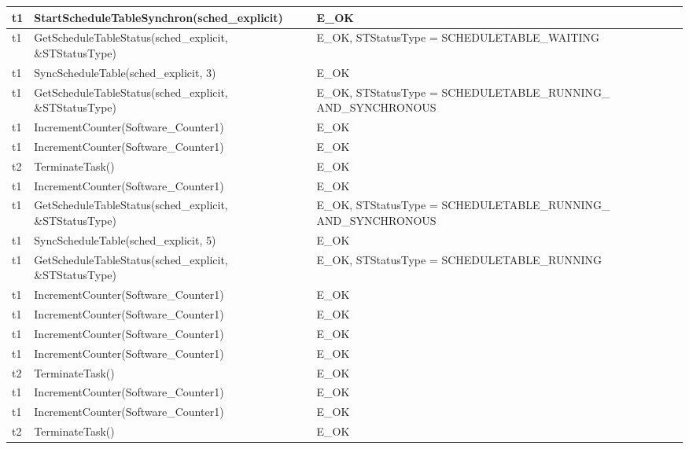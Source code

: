 \documentclass[10pt]{article}
\newlength{\Li}\settowidth{\Li}{Running}
\newlength{\Lii}\setlength{\Lii}{7cm}
\newlength{\Liiii}\setlength{\Liiii}{0.9cm}
\newlength{\Liii}\setlength{\Liii}{\textwidth} \addtolength{\Liii}{-\Li} \addtolength{\Liii}{-\Lii} \addtolength{\Liii}{-\Liiii}
\begin{document}
	\begin{supertabular}{|p{\Li}|p{\Lii}|p{\Liii}|p{\Liiii}|} \hline 
	t1		& StartScheduleTableSynchron(sched\_explicit)					& E\_OK																	& \\ \hline
	t1		& GetScheduleTableStatus(sched\_explicit, \&STStatusType)			& E\_OK, STStatusType = SCHEDULETABLE\_WAITING								& \\ \hline
	t1		& SyncScheduleTable(sched\_explicit, 3)							& E\_OK																	& \\ \hline
	t1		& GetScheduleTableStatus(sched\_explicit, \&STStatusType)			& E\_OK, STStatusType = SCHEDULETABLE\_RUNNING\_ AND\_SYNCHRONOUS		& \\ \hline
	t1		& IncrementCounter(Software\_Counter1)						& E\_OK																	& \\ \hline
	t1		& IncrementCounter(Software\_Counter1)						& E\_OK																	& \\ \hline
	t2		& TerminateTask()											& E\_OK																	& \\ \hline
	t1		& IncrementCounter(Software\_Counter1)						& E\_OK																	& \\ \hline
	t1		& GetScheduleTableStatus(sched\_explicit, \&STStatusType)			& E\_OK, STStatusType = SCHEDULETABLE\_RUNNING\_ AND\_SYNCHRONOUS		& \\ \hline
	t1		& SyncScheduleTable(sched\_explicit, 5)							& E\_OK																	& \\ \hline
	t1		& GetScheduleTableStatus(sched\_explicit, \&STStatusType)			& E\_OK, STStatusType = SCHEDULETABLE\_RUNNING 							& \\ \hline
	t1		& IncrementCounter(Software\_Counter1)						& E\_OK																	& \\ \hline
	t1		& IncrementCounter(Software\_Counter1)						& E\_OK																	& \\ \hline
	t1		& IncrementCounter(Software\_Counter1)						& E\_OK																	& \\ \hline
	t1		& IncrementCounter(Software\_Counter1)						& E\_OK																	& \\ \hline
	t2		& TerminateTask()											& E\_OK																	& \\ \hline
	t1		& IncrementCounter(Software\_Counter1)						& E\_OK																	& \\ \hline
	t1		& IncrementCounter(Software\_Counter1)						& E\_OK																	& \\ \hline
	t2		& TerminateTask()											& E\_OK																	& \\ \hline

\end{supertabular}
\end{document}
